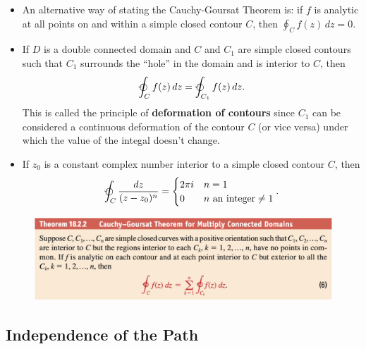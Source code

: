 \documentclass{article}
\begin{document}
\begin{itemize}
  \item An alternative way of stating the Cauchy-Goursat Theorem is: if $f$ is analytic at all points on and within a simple closed contour $C$, then $\oint_C f(z) \,d z = 0$.

  \item If $D$ is a double connected domain and $C$ and $C_1$ are simple closed contours such that $C_1$ surrounds the ``hole'' in the domain and is interior to $C$, then \[\varointctrclockwise_C f(z) \,d z = \varointctrclockwise_{C_1} f(z) \,d z.\] This is called the principle of \textbf{deformation of contours} since $C_1$ can be considered a continuous deformation of the contour $C$ (or vice versa) under which the value of the integal doesn't change.

  \item If $z_0$ is a constant complex number interior to a simple closed contour $C$, then \[\varointctrclockwise_C \frac{d z}{(z - z_0)^n} = \begin{cases}
            2 \pi i & n = 1                      \\
            0       & n \text{ an integer} \ne 1
          \end{cases}.\]
\end{itemize}

\begin{figure}[H]
  \centering
  \includegraphics[width=\textwidth]{cauchy-goursat-theorem-multiply-connected-domains}
\end{figure}

\subsection{Independence of the Path}
\end{document}
